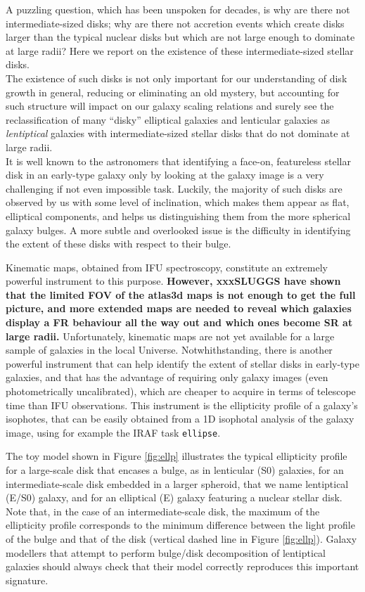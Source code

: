 \documentclass[preprint2]{emulateapj}
\begin{document}
A puzzling question, which has been unspoken for decades, 
is why are there not intermediate-sized disks; 
why are there not accretion events which create disks larger than the typical nuclear disks 
but which are not large enough to dominate at large radii? 
Here we report on the existence of these intermediate-sized stellar disks. \\

The existence of such disks is not only important for our understanding of disk growth in general, 
reducing or eliminating an old mystery, 
but accounting for such structure will impact on our galaxy scaling relations 
and surely see the reclassification of many ``disky'' elliptical galaxies 
and lenticular galaxies as \emph{lentiptical} 
galaxies with intermediate-sized stellar disks that do not dominate at large radii. \\ 

It is well known to the astronomers that identifying a face-on, featureless stellar disk 
in an early-type galaxy only by looking at the galaxy image 
is a very challenging if not even impossible task. 
Luckily, the majority of such disks are observed by us with some level of inclination, 
which makes them appear as flat, elliptical components, 
and helps us distinguishing them from the more spherical galaxy bulges. 
A more subtle and overlooked issue is the difficulty in identifying the extent of these disks 
with respect to their bulge. 

Kinematic maps, obtained from IFU spectroscopy, constitute an extremely powerful instrument to this purpose. 
{\bf However, xxxSLUGGS have shown that the limited FOV of the atlas3d maps is not enough to get the full picture,
and more extended maps are needed to reveal which galaxies display a FR behaviour all the way out 
and which ones become SR at large radii.}
Unfortunately, kinematic maps are not yet available for a large sample of galaxies in the local Universe. 
Notwhithstanding, there is another powerful instrument that can help identify the extent of 
stellar disks in early-type galaxies, 
and that has the advantage of requiring only galaxy images (even photometrically uncalibrated), 
which are cheaper to acquire in terms of telescope time than IFU observations. 
This instrument is the ellipticity profile of a galaxy's isophotes, 
that can be easily obtained from a 1D isophotal analysis of the galaxy image, 
using for example the IRAF task {\tt ellipse}. 

The toy model shown in Figure \ref{fig:ellp} illustrates the typical ellipticity profile 
for a large-scale disk that encases a bulge, as in lenticular (S0) galaxies, 
for an intermediate-scale disk embedded in a larger spheroid, that we name lentiptical (E/S0) galaxy, 
and for an elliptical (E) galaxy featuring a nuclear stellar disk. 
Note that, in the case of an intermediate-scale disk, 
the maximum of the ellipticity profile corresponds to the minimum difference between the 
light profile of the bulge and that of the disk (vertical dashed line in Figure \ref{fig:ellp}). 
Galaxy modellers that attempt to perform bulge/disk decomposition of lentiptical galaxies 
should always check that their model correctly reproduces this important signature.
\end{document}
